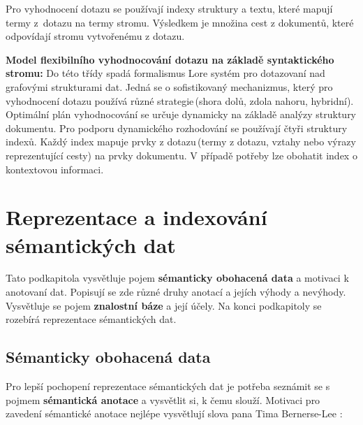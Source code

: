 Pro vyhodnocení dotazu se používají indexy struktury a textu, které mapují termy z~dotazu na termy stromu. Výsledkem je množina cest z dokumentů, které odpovídají stromu vytvořenému z dotazu.

\textbf{Model flexibilního vyhodnocování dotazu na základě syntaktického stromu:} Do této třídy spadá formalismus Lore systém \cite{McHugh1997LoreAD} pro dotazovaní nad grafovými strukturami dat. Jedná se o sofistikovaný mechanizmus, který pro vyhodnocení dotazu používá různé strategie\,(shora dolů, zdola nahoru, hybridní). Optimální plán vyhodnocování se určuje dynamicky na základě analýzy struktury dokumentu. Pro podporu dynamického rozhodování se používají čtyři struktury indexů. Každý index mapuje prvky z dotazu\,(termy z dotazu, vztahy nebo výrazy reprezentující cesty) na prvky dokumentu. V případě potřeby lze obohatit index o kontextovou informaci.

\section{Reprezentace a indexování sémantických dat}

Tato podkapitola vysvětluje pojem \textbf{sémanticky obohacená data} a motivaci k anotovaní dat. Popisují se zde různé druhy anotací a jejích výhody a nevýhody. Vysvětluje se pojem \textbf{znalostní báze} a její účely. Na konci podkapitoly se rozebírá reprezentace sémantických dat.

\subsection{Sémanticky obohacená data}
\label{semanticEnrichedData}
Pro lepší pochopení reprezentace sémantických dat je potřeba  seznámit se s pojmem \textbf{sémantická anotace} a vysvětlit si, k čemu slouží. Motivaci pro zavedení sémantické anotace nejlépe vysvětlují slova pana Tima Bernerse-Lee \cite{handschuh2005creating}:

\begin{quotation}
\end{quotation}

